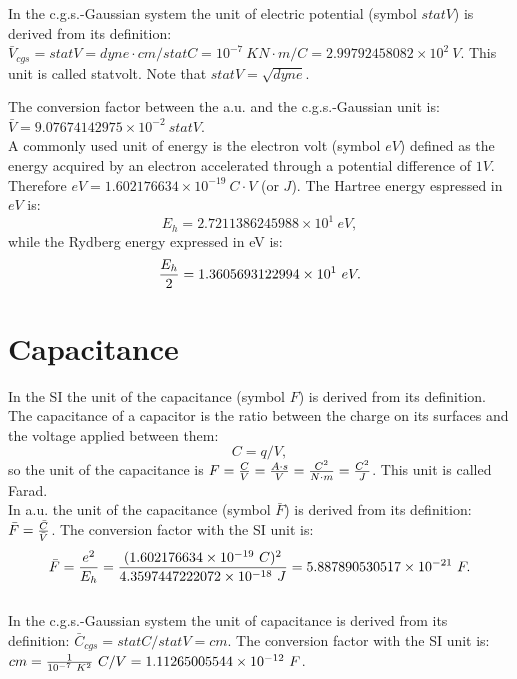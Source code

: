 \documentclass[12pt,a4paper]{article}
\def\e{1.602176634\times 10^{-19}}
\def\baru{4.3597447222072\times 10^{-18}}
\def\barc{1.602176634\times 10^{-19}}
\def\barphi{2.7211386245988\times 10^{1}}
\def\barcap{5.887890530517\times 10^{-21}}
\def\phitophi{2.99792458082\times 10^{2}}
\def\captocap{1.11265005544\times 10^{-12}}
\def\barphicgs{9.07674142975\times 10^{-2}}
\def\ryev{1.3605693122994\times 10^{1}}
\begin{document}
{\color{orange} In the c.g.s.-Gaussian system the unit of electric potential
(symbol $statV$) is derived from its definition: 
$\bar V_{cgs}=statV=dyne\cdot cm / statC = {10^{-7}\ K} 
N\cdot m/C=\phitophi\ V$. This unit
is called statvolt. Note that 
$statV=\sqrt{dyne}$.
\\
}

{\color{green} 
The conversion factor between the a.u. and the c.g.s.-Gaussian unit
is:
$\bar V = \barphicgs \ statV$.
}
\\

{\color{red} A commonly used unit of energy is the electron volt (symbol $eV$)
defined as the energy acquired by an electron accelerated through a
potential difference of $1 V$. Therefore $eV=\e\ C\cdot V$ (or $J$).
The Hartree energy espressed in $eV$ is: 
\begin{equation}
E_h=\barphi\ eV,
\end{equation}
while the Rydberg energy expressed in eV is:
\begin{equation}
{E_h \over 2}=\ryev\ eV.
\end{equation}
}

\newpage
\section{\color{coral}Capacitance}
In the SI the unit of the capacitance (symbol $F$) is derived from its 
definition. The capacitance of a capacitor is the ratio between the charge
on its surfaces and the voltage applied between them:
\begin{equation}
C=q/V,
\end{equation}
so the unit of the capacitance is $F={C \over V}={A \cdot s \over V}=
{C^2 \over N \cdot m}
={C^2 \over J}$. This unit is called Farad.
\\

{\color{web-blue} In a.u. the unit of the capacitance (symbol $\bar F$) 
is derived from its definition: $\bar F={\bar C \over \bar V}$. The 
conversion factor with the SI unit is:
\begin{equation}
\bar F = {e^2 \over E_h} = {(\barc\ C)^2\over \baru\ J}=\barcap\ F.
\end{equation}
}
\\

{\color{orange} In the c.g.s.-Gaussian system the unit of capacitance
is derived from its definition: $\bar C_{cgs}=statC/statV=cm$. The 
conversion factor with the SI unit is:
$cm={1\over 10^{-7}\ K^2}\ C/V=\captocap\ F$.
}
\\
\end{document}
